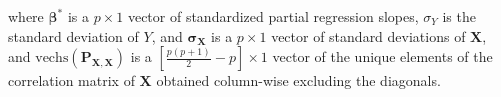 \noindent where
$\boldsymbol{\beta}^{\ast}$ is a $p \times 1$ vector of standardized partial regression slopes,
$\sigma_{Y}$ is the standard deviation of $Y$,
and
$\boldsymbol{\sigma}_{\mathbf{X}}$
is a $p \times 1$ vector of standard deviations of $\mathbf{X}$,
and
$\mathrm{vechs} \left( \mathbf{P}_{\mathbf{X}, \mathbf{X}} \right)$
is a $\left[ \frac{p \left( p + 1 \right)}{2} - p \right] \times 1$
vector of the unique elements
of the correlation matrix of
$\mathbf{X}$
obtained column-wise
excluding the diagonals.
